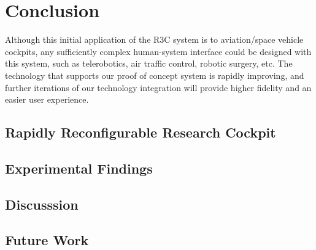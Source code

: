 \chapter{Conclusion}
\label{chap:conclusion}

Although this initial application of the R3C system is to aviation/space vehicle cockpits, any sufficiently complex human-system interface could be designed with this system, such as telerobotics, air traffic control, robotic surgery, etc.
The technology that supports our proof of concept system is rapidly improving, and further iterations of our technology integration will provide higher fidelity and an easier user experience.

\section{Rapidly Reconfigurable Research Cockpit}

\section{Experimental Findings}

\section{Discusssion}

\section{Future Work}
